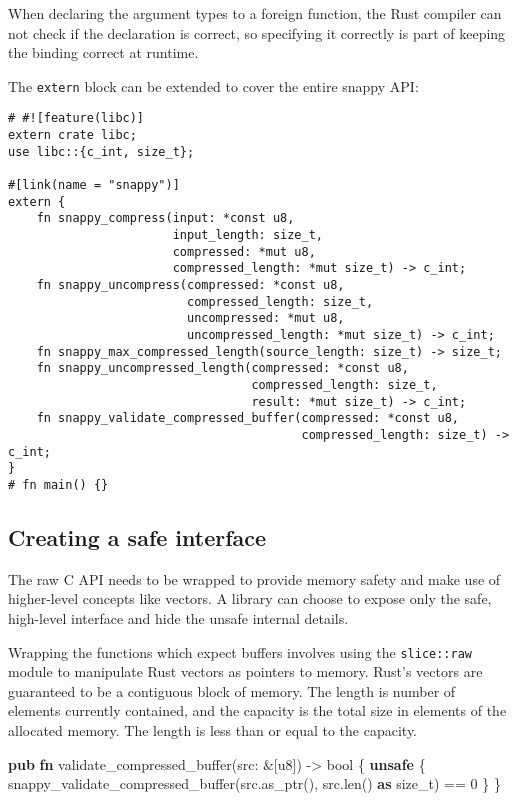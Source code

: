 \documentclass[a4paper,]{book}
\newenvironment{Shaded}{\begin{snugshade}}{\end{snugshade}}
\newcommand{\KeywordTok}[1]{\textcolor[rgb]{0.13,0.29,0.53}{\textbf{{#1}}}}
\newcommand{\DataTypeTok}[1]{\textcolor[rgb]{0.13,0.29,0.53}{{#1}}}
\newcommand{\DecValTok}[1]{\textcolor[rgb]{0.00,0.00,0.81}{{#1}}}
\newcommand{\NormalTok}[1]{{#1}}
\begin{document}
When declaring the argument types to a foreign function, the Rust
compiler can not check if the declaration is correct, so specifying it
correctly is part of keeping the binding correct at runtime.

The \texttt{extern} block can be extended to cover the entire snappy
API:

\begin{verbatim}
# #![feature(libc)]
extern crate libc;
use libc::{c_int, size_t};

#[link(name = "snappy")]
extern {
    fn snappy_compress(input: *const u8,
                       input_length: size_t,
                       compressed: *mut u8,
                       compressed_length: *mut size_t) -> c_int;
    fn snappy_uncompress(compressed: *const u8,
                         compressed_length: size_t,
                         uncompressed: *mut u8,
                         uncompressed_length: *mut size_t) -> c_int;
    fn snappy_max_compressed_length(source_length: size_t) -> size_t;
    fn snappy_uncompressed_length(compressed: *const u8,
                                  compressed_length: size_t,
                                  result: *mut size_t) -> c_int;
    fn snappy_validate_compressed_buffer(compressed: *const u8,
                                         compressed_length: size_t) -> c_int;
}
# fn main() {}
\end{verbatim}

\subsection{Creating a safe interface}\label{creating-a-safe-interface}

The raw C API needs to be wrapped to provide memory safety and make use
of higher-level concepts like vectors. A library can choose to expose
only the safe, high-level interface and hide the unsafe internal
details.

Wrapping the functions which expect buffers involves using the
\texttt{slice::raw} module to manipulate Rust vectors as pointers to
memory. Rust's vectors are guaranteed to be a contiguous block of
memory. The length is number of elements currently contained, and the
capacity is the total size in elements of the allocated memory. The
length is less than or equal to the capacity.

\begin{Shaded}
\begin{Highlighting}[]
\KeywordTok{pub} \KeywordTok{fn} \NormalTok{validate_compressed_buffer(src: &[}\DataTypeTok{u8}\NormalTok{]) -> }\DataTypeTok{bool} \NormalTok{\{}
    \KeywordTok{unsafe} \NormalTok{\{}
        \NormalTok{snappy_validate_compressed_buffer(src.as_ptr(), src.len() }\KeywordTok{as} \DataTypeTok{size_t}\NormalTok{) == }\DecValTok{0}
    \NormalTok{\}}
\NormalTok{\}}
\end{Highlighting}
\end{Shaded}
\end{document}
